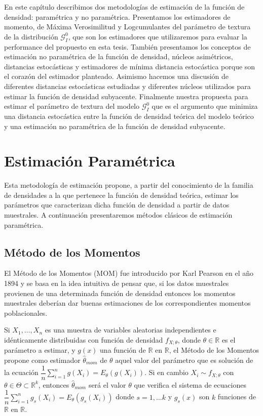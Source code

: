En este capítulo describimos dos metodologías de estimación de la función de densidad: paramétrica y no paramétrica. Presentamos los estimadores de momento, de Máxima Verosimilitud y Logcumulantes del parámetro de textura de la distribución $\mathcal{G}_I^0$, que son los estimadores que utilizaremos para evaluar la performance del propuesto en esta tesis. También presentamos los conceptos de estimación no paramétrica de la función de densidad, núcleos asimétricos, distancias estocásticas y estimadores de mínima distancia estocástica porque son el corazón del estimador planteado.  Asimismo hacemos una discusión de diferentes distancias estocásticas estudiadas y diferentes núcleos utilizados para estimar la función de densidad subyacente. Finalmente nuestra propuesta para estimar el parámetro de textura del modelo $\mathcal{G}_I^0$ que es el argumento que minimiza una distancia estocástica entre la función de densidad teórica del modelo teórico y una estimación no paramétrica de la función de densidad subyacente. 


\section{Estimación Paramétrica}
\label{EstimacionParamétrica}

Esta metodología de estimación propone, a partir del conocimiento de la familia de densidades a la que pertenece la función de densidad teórica, estimar los parámetros que caracterizan dicha función de densidad a partir de datos muestrales. A continuación presentaremos métodos clásicos de estimación paramétrica.

\subsection{Método de los Momentos}
\label{MetodoMOM}
El Método de los Momentos (MOM) fue introducido por Karl Pearson en el año 1894 y se basa en la idea intuitiva de pensar que, si los datos muestrales provienen de una determinada función de densidad entonces los momentos muestrales deberían dar buenas estimaciones de los correspondientes momentos poblacionales. 

\begin{definition}
Si $X_1, \ldots, X_n$ es una muestra de variables aleatorias independientes e idénticamente distribuidas con función de densidad $f_{X;\theta}$, donde $\theta \in \mathbb{R}$ es el parámetro a estimar, y $g(x)$ una función de $\mathbb{R}$ en $\mathbb{R}$, el Método de los Momentos propone como estimador $\hat{\theta}_{mom}$ de $\theta$ aquel valor del parámetro que es solución de la ecuación  $\dfrac{1}{n} \sum_{i=1}^n g(X_i)=E_{\theta}(g(X_i)).$  
Si en cambio $X_i \sim f_{X;\theta}$ con $\theta \in \Theta \subset \mathbb{R}^k$, entonces $\hat{\theta}_{mom}$ será el valor $\theta$ que verifica el sistema de ecuaciones $\dfrac{1}{n} \sum_{i=1}^n g_s(X_i)=E_{\theta}(g_s(X_i))$ donde $s=1, \ldots k$ y $g_s(x)$ son $k$ funciones de $\mathbb{R}$ en $\mathbb{R}$.
\end{definition}


